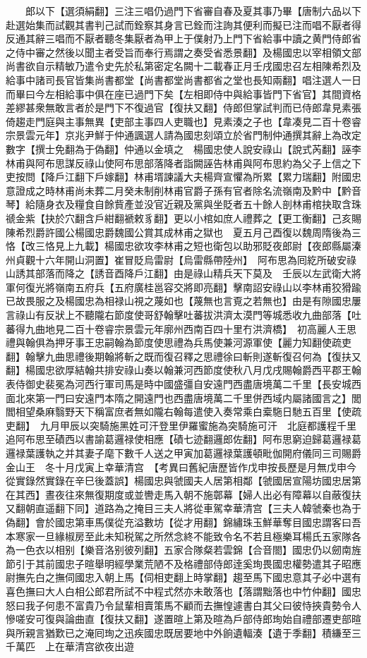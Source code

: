 　　郎以下【選須絹翻】三注三唱仍過門下省審自春及夏其事乃畢【唐制六品以下赴選始集而試觀其書判己試而銓察其身言已銓而注詢其便利而擬已注而唱不厭者得反通其辭三唱而不厭者聽冬集厭者為甲上于僕射乃上門下省給事中讀之黄門侍郎省之侍中審之然後以聞主者受旨而奉行焉謂之奏受省悉景翻】及楊國忠以宰相領文部尚書欲自示精敏乃遣令史先於私第密定名闕十二載春正月壬戌國忠召左相陳希烈及給事中諸司長官皆集尚書都堂【尚書都堂尚書都省之堂也長知兩翻】唱注選人一日而畢曰今左相給事中俱在座已過門下矣【左相即侍中與給事皆門下省官】其間資格差繆甚衆無敢言者於是門下不復過官【復扶又翻】侍郎但掌試判而已侍郎韋見素張倚趨走門庭與主事無異【吏部主事四人吏職也】見素湊之子也【韋凑見二百十卷睿宗景雲元年】京兆尹鮮于仲通諷選人請為國忠刻頌立於省門制仲通撰其辭上為改定數字【撰士免翻為于偽翻】仲通以金填之　楊國忠使人說安祿山【說式芮翻】誣李林甫與阿布思謀反祿山使阿布思部落降者詣闕誣告林甫與阿布思約為父子上信之下吏按問【降戶江翻下戶嫁翻】林甫壻諫議大夫楊齊宣懼為所累【累力瑞翻】附國忠意證成之時林甫尚未葬二月癸未制削林甫官爵子孫有官者除名流嶺南及黔中【黔音琴】給隨身衣及糧食自餘貲產並没官近親及黨與坐貶者五十餘人剖林甫棺抉取含珠禠金紫【抉於穴翻含戶紺翻褫敕豸翻】更以小棺如庶人禮葬之【更工衡翻】己亥賜陳希烈爵許國公楊國忠爵魏國公賞其成林甫之獄也　夏五月己酉復以魏周隋後為三恪【改三恪見上九載】楊國忠欲攻李林甫之短也衛包以助邪貶夜郎尉【夜郎縣屬溱州貞觀十六年開山洞置】崔冒貶烏雷尉【烏雷縣帶陸州】　阿布思為囘紇所破安祿山誘其部落而降之【誘音酉降戶江翻】由是祿山精兵天下莫及　壬辰以左武衛大將軍何復光將嶺南五府兵【五府廣桂邕容交將即亮翻】擊南詔安祿山以李林甫狡猾踰已故畏服之及楊國忠為相禄山視之蔑如也【蔑無也言覔之若無也】由是有隙國忠屢言祿山有反狀上不聽隴右節度使哥舒翰擊吐蕃拔洪濟太漠門等城悉收九曲部落【吐蕃得九曲地見二百十卷睿宗景雲元年廓州西南百四十里冇洪濟橋】　初高麗人王思禮與翰俱為押牙事王忠嗣翰為節度使思禮為兵馬使兼河源軍使【麗力知翻使疏吏翻】翰擊九曲思禮後期翰將斬之既而復召釋之思禮徐曰斬則遂斬復召何為【復扶又翻】楊國忠欲厚結翰共排安祿山奏以翰兼河西節度使秋八月戊戌賜翰爵西平郡王翰表侍御史裴冕為河西行軍司馬是時中國盛彊自安遠門西盡唐境萬二千里【長安城西面北來第一門曰安遠門本隋之開遠門也西盡唐境萬二千里併西域内屬諸國言之】閭閻相望桑麻翳野天下稱富庶者無如隴右翰每遣使入奏常乘白槖駞日馳五百里【使疏吏翻】　九月甲辰以突騎施黑姓可汗登里伊羅蜜施為突騎施可汗　北庭都護程千里追阿布思至磧西以書諭葛邏禄使相應【磧七迹翻邏郎佐翻】阿布思窮迫歸葛邏禄葛邏禄葉護執之并其妻子麾下數千人送之甲寅加葛邏禄葉護頓毗伽開府儀同三司賜爵金山王　冬十月戊寅上幸華清宫　【考異曰舊紀唐歷皆作戊申按長歷是月無戊申今從實錄然實錄在辛巳後蓋誤】楊國忠與虢國夫人居第相鄰【虢國居宣陽坊國忠居第在其西】晝夜往來無復期度或並轡走馬入朝不施鄣幕【婦人出必有障幕以自蔽復扶又翻朝直遥翻下同】道路為之掩目三夫人將從車駕幸華清宫【三夫人韓虢秦也為于偽翻】會於國忠第車馬僕從充溢數坊【從才用翻】錦繡珠玉鮮華奪目國忠謂客曰吾本寒家一旦緣椒房至此未知税駕之所然念終不能致令名不若且極樂耳楊氏五家隊各為一色衣以相别【樂音洛别彼列翻】五家合隊粲若雲錦【合音閤】國忠仍以劒南旌節引于其前國忠子暄舉明經學業荒陋不及格禮部侍郎逹奚珣畏國忠權勢遣其子昭應尉撫先白之撫伺國忠入朝上馬【伺相吏翻上時掌翻】趨至馬下國忠意其子必中選有喜色撫曰大人白相公郎君所試不中程式然亦未敢落也【落謂黜落也中竹仲翻】國忠怒曰我子何患不富貴乃令鼠輩相賣策馬不顧而去撫惶遽書白其父曰彼恃挾貴勢令人慘嗟安可復與論曲直【復扶又翻】遂置暄上第及暄為戶部侍郎珣始自禮部遷吏部暄與所親言猶歎已之淹囘珣之迅疾國忠既居要地中外餉遺輻湊【遺于季翻】積縑至三千萬匹　上在華清宫欲夜出遊